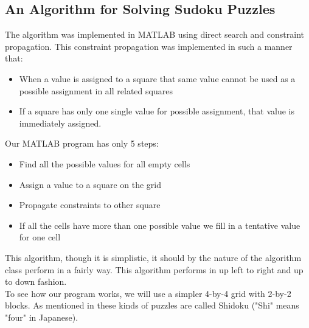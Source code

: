 \documentclass[12pt,a4paper]{article} %
\begin{document}
\subsection{An Algorithm for Solving Sudoku Puzzles}
The algorithm was implemented in MATLAB using direct search and constraint propagation. This constraint propagation was implemented in such a manner that: 
\begin{itemize}
\item When a value is assigned to a square that same value cannot be used as a possible assignment in all related squares
\item If a square has only one single value for possible assignment, that value is immediately assigned.
\end{itemize}
Our MATLAB program has only 5 steps:
\begin{itemize}
\item Find all the possible values for all empty cells
\item Assign a value to a square on the grid
\item Propagate constraints to other square
\item If all the cells have more than one possible value we fill in a tentative value for one cell
\end{itemize}
This algorithm, though it is simplistic, it should by the nature of the algorithm class perform in a fairly way. This algorithm performs in up left to right and up to down fashion.
\newline
\\ To see how our program works, we will use a simpler 4-by-4 grid with 2-by-2 blocks. As mentioned in \cite{crook2009pencil} these kinds of puzzles are called Shidoku ("Shi" means "four" in Japanese). 
\end{document}
